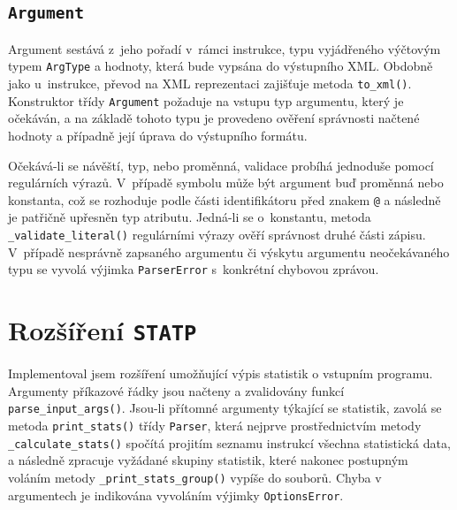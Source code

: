 \documentclass{article}[a4paper]
\begin{document}
    \subsection{\texttt{Argument}}
    \label{sec:argument}

    Argument sestává z~jeho pořadí v~rámci instrukce, typu vyjádřeného výčtovým typem \texttt{ArgType} a hodnoty, která bude vypsána do výstupního XML.
    Obdobně jako u~instrukce, převod na XML reprezentaci zajišťuje metoda \texttt{to\_xml()}.
    Konstruktor třídy \texttt{Argument} požaduje na vstupu typ argumentu, který je očekáván, a na základě tohoto typu je provedeno ověření správnosti načtené hodnoty a případně její úprava do výstupního formátu.

    Očekává-li se návěští, typ, nebo proměnná, validace probíhá jednoduše pomocí regulárních výrazů.
    V~případě symbolu může být argument buď proměnná nebo konstanta, což se rozhoduje podle části identifikátoru před znakem \texttt{@} a následně je patřičně upřesněn typ atributu.
    Jedná-li se o~konstantu, metoda \texttt{\_validate\_literal()} regulárními výrazy ověří správnost druhé části zápisu.
    V~případě nesprávně zapsaného argumentu či výskytu argumentu neočekávaného typu se vyvolá výjimka \texttt{ParserError} s~konkrétní chybovou zprávou.

    \section{Rozšíření \texttt{STATP}}

    Implementoval jsem rozšíření umožňující výpis statistik o vstupním programu.
    Argumenty příkazové řádky jsou načteny a zvalidovány funkcí \texttt{parse\_input\_args()}.
    Jsou-li přítomné argumenty týkající se statistik, zavolá se metoda \texttt{print\_stats()} třídy \texttt{Parser},
    která nejprve prostřednictvím metody \texttt{\_calculate\_stats()} spočítá projitím seznamu instrukcí všechna statistická data,
    a následně zpracuje vyžádané skupiny statistik, které nakonec postupným voláním metody \texttt{\_print\_stats\_group()} vypíše do souborů.
    Chyba v argumentech je indikována vyvoláním výjimky \texttt{OptionsError}.
\end{document}
